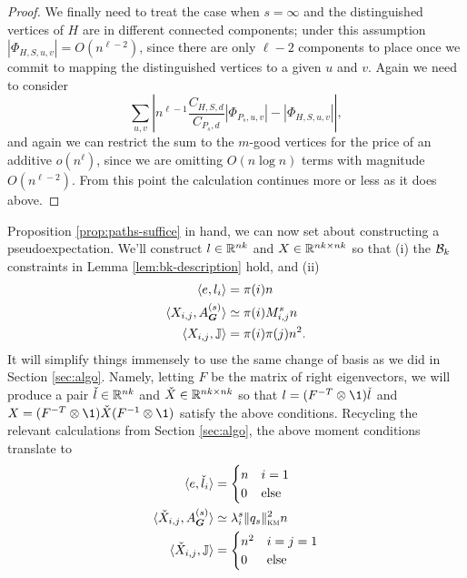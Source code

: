 \begin{proof}
    We finally need to treat the case when $s = \infty$ and the distinguished vertices of $H$ are in different connected components; under this assumption $|\Phi_{H,S,u,v}| = O(n^{\ell - 2})$, since there are only $\ell - 2$ components to place once we commit to mapping the distinguished vertices to a given $u$ and $v$. Again we need to consider
    $$
        \sum_{u,v}\left|n^{\ell - 1}\frac{C_{H,S,d}}{C_{P_s,d}}|\Phi_{P_s,u,v}| - |\Phi_{H,S,u,v}|\right|,
    $$
    and again we can restrict the sum to the $m$-good vertices for the price of an additive $o(n^\ell)$, since we are omitting $O(n\log n)$ terms with magnitude $O(n^{\ell - 2})$. From this point the calculation continues more or less as it does above.
\end{proof}
    
Proposition \ref{prop:paths-suffice} in hand, we can now set about constructing a pseudoexpectation. We'll construct $l\in \mathbb{R}^{nk}$ and $X \in \mathbb{R}^{nk\times nk}$ so that (i) the $\mathcal{B}_k$ constraints in Lemma \ref{lem:bk-description} hold, and (ii)
\begin{align*}
    \langle e, l_i \rangle &= \pi(i)n \\
    \langle X_{i,j}, A^{(s)}_{\boldsymbol{G}} \rangle &\simeq \pi(i)M_{i,j}^s n \\
    \langle X_{i,j}, \mathbb{J} \rangle &= \pi(i)\pi(j)n^2. 
\end{align*}
It will simplify things immensely to use the same change of basis as we did in Section \ref{sec:algo}. Namely, letting $F$ be the matrix of right eigenvectors, we will produce a pair $\check l \in \mathbb{R}^{nk}$ and $\check X \in \mathbb{R}^{nk\times nk}$ so that $l = (F^{-T} \otimes \1) \check l$ and $X = (F^{-T}\otimes \1) \check X (F^{-1} \otimes \1)$ satisfy the above conditions. Recycling the relevant calculations from Section \ref{sec:algo}, the above moment conditions translate to
\begin{align*}
    \langle e, \check l_i \rangle &= \begin{cases} n & i = 1 \\ 0 & \text{else} \end{cases} \\
    \langle \check X_{i,j}, A^{(s)}_{\boldsymbol{G}} \rangle &\simeq \lambda_i^s \|q_s\|^2_{\textsc{km}} n \\
    \langle \check X_{i,j}, \mathbb{J} \rangle &= \begin{cases} n^2 & i=j = 1 \\ 
    0 & \text{else} \end{cases}
\end{align*}


